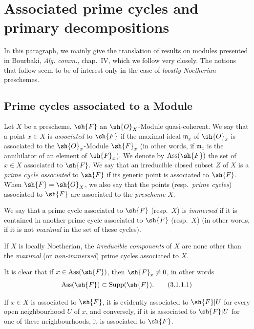 \section{Associated prime cycles and primary decompositions}
\label{section:IV.3}


In this paragraph, we mainly give the translation of results on modules presented in Bourbaki, \emph{Alg. comm.}, chap.~IV, which we follow very closely.
The notions that follow seem to be of interest only in the case of \emph{locally Noetherian} preschemes.

\subsection{Prime cycles associated to a Module}
\label{subsection:IV.3.1}

\begin{definition}[3.1.1]
\label{IV.3.1.1}
Let $X$ be a prescheme, $\sh{F}$ an $\sh{O}_X$-Module quasi-coherent.
We say that a point $x\in X$ is \emph{associated} to $\sh{F}$ if the maximal ideal $\mathfrak{m}_x$ of $\sh{O}_x$ is associated to the $\sh{O}_x$-Module $\sh{F}_x$ (in other words, if $\mathfrak{m}_x$ is the annihilator of an element of $\sh{F}_x$).
We denote by $\operatorname{Ass}(\sh{F})$ the set of $x\in X$ associated to $\sh{F}$.
We say that an irreducible closed subset $Z$ of $X$ is a \emph{prime cycle associated} to $\sh{F}$ if its generic point is associated to $\sh{F}$.
When $\sh{F}=\sh{O}_X$, we also say that the points (resp.\ \emph{prime cycles}) associated to $\sh{F}$ are associated to the \emph{prescheme} $X$.
\end{definition}

We say that a prime cycle associated to $\sh{F}$ (resp.\ $X$) is \emph{immersed} if it is contained in another prime cycle associated to $\sh{F}$ (resp.\ $X$) (in other words, if it is not \emph{maximal} in the set of these cycles).

If $X$ is locally Noetherian, the \emph{irreducible components} of $X$ are none other than the \emph{maximal} (or \emph{non-immersed}) prime cycles associated to $X$.

It is clear that if $x\in\operatorname{Ass}(\sh{F})$, then $\sh{F}_x\neq 0$, in other words
\[
\label{IV.3.1.1.1}
\operatorname{Ass}(\sh{F})\subset\operatorname{Supp}(\sh{F}).
\tag{3.1.1.1}
\]

If $x\in X$ is associated to $\sh{F}$, it is evidently associated to $\sh{F}|U$ for every open neighbourhood $U$ of $x$, and conversely, if it is associated to $\sh{F}|U$ for one of these neighbourhoods, it is associated to $\sh{F}$.

